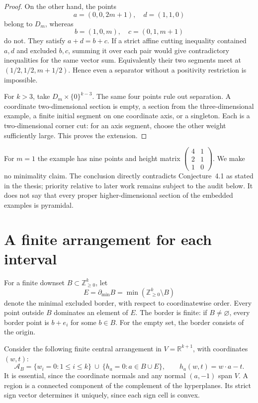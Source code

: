 \documentclass[11pt]{article}
\theoremstyle{remark}
\newcommand{\A}{\mathcal A}
\newcommand{\NN}{\mathbb Z_{\geq0}}
\newcommand{\RR}{\mathbb R}
\newcommand{\bd}{\partial_{\min}}
\begin{document}
\begin{proof}
On the other hand, the points
\[
 a=(0,0,2m+1),\quad d=(1,1,0)
\]
belong to $D_m$, whereas
\[
 b=(1,0,m),\quad c=(0,1,m+1)
\]
do not. They satisfy $a+d=b+c$. If a strict affine cutting inequality
contained $a,d$ and excluded $b,c$, summing it over each pair would give
contradictory inequalities for the same vector sum. Equivalently their two
segments meet at $(1/2,1/2,m+1/2)$. Hence even a separator without a
positivity restriction is impossible.

For $k>3$, take $D_m\times\{0\}^{k-3}$. The same four points rule out
separation. A coordinate two-dimensional section is empty, a section from the
three-dimensional example, a finite initial segment on one coordinate axis,
or a singleton. Each is a two-dimensional corner cut: for an axis segment,
choose the other weight sufficiently large. This proves the extension.
\end{proof}

For $m=1$ the example has nine points and height matrix
$\left(\begin{smallmatrix}4&1\\2&1\\1&0\end{smallmatrix}\right)$.
We make no minimality claim. The conclusion directly contradicts
Conjecture~4.1 as stated in the thesis; priority relative to later work
remains subject to the audit below. It does not say that every proper
higher-dimensional section of the embedded examples is pyramidal.

\section{A finite arrangement for each interval}

For a finite downset $B\subset\NN^k$, let
\[
 E=\bd B=\min(\NN^k\setminus B)
\]
denote the minimal excluded border, with respect to coordinatewise order.
Every point outside $B$ dominates an element of $E$. The border is finite:
if $B\ne\varnothing$, every border point is $b+e_i$ for some $b\in B$.
For the empty set, the border consists of the origin.

Consider the following finite central arrangement in $V=\RR^{k+1}$, with
coordinates $(w,t)$:
\begin{equation}\label{eq:arrangement}
 \A_B=\{w_i=0:1\leq i\leq k\}
 \ \cup\ \{h_a=0:a\in B\cup E\},\qquad h_a(w,t)=w\cdot a-t.
\end{equation}
It is essential, since the coordinate normals and any normal $(a,-1)$ span $V$.
A region is a connected component of the complement of the hyperplanes.
Its strict sign vector determines it uniquely, since each sign cell is convex.
\end{document}

